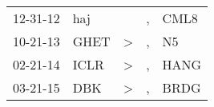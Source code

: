 \begin{supertabular}{p{0.07\textwidth}p{0.06\textwidth}p{0.02\textwidth}p{0.02\textwidth}p{0.06\textwidth}}
 12-31-12\textsuperscript{} &   haj\textsuperscript{} &               &  , &  CML8\textsuperscript{} \\
 10-21-13\textsuperscript{} &  GHET\textsuperscript{} &  \textgreater &  , &    N5\textsuperscript{} \\
 02-21-14\textsuperscript{} &  ICLR\textsuperscript{} &  \textgreater &  , &  HANG\textsuperscript{} \\
 03-21-15\textsuperscript{} &   DBK\textsuperscript{} &  \textgreater &  , &  BRDG\textsuperscript{} \\
\end{supertabular}
